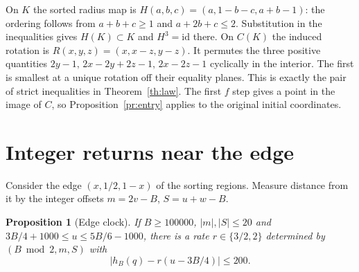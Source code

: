 \documentclass[11pt,reqno]{amsart}
\newtheorem{proposition}[theorem]{Proposition}
\begin{document}
On $K$ the sorted radius map is $H(a,b,c)=(a,1-b-c,a+b-1)$:
the ordering follows from $a+b+c\ge1$ and $a+2b+c\le2$. Substitution
in the inequalities gives $H(K)\subset K$ and $H^3=\mathrm{id}$ there.
On $C(K)$ the induced rotation is $R(x,y,z)=(x,x-z,y-z)$. It permutes
the three positive quantities $2y-1,\,2x-2y+2z-1,\,2x-2z-1$ cyclically
in the interior. The first is smallest at a unique rotation off their
equality planes. This is exactly the pair of strict inequalities in
Theorem~\ref{th:law}. The first $f$ step gives a point in the image of $C$,
so Proposition~\ref{pr:entry} applies to the original initial coordinates.
\section{Integer returns near the edge}
Consider the edge $(x,1/2,1-x)$ of the sorting regions. Measure distance
from it by the integer offsets $m=2v-B$, $S=u+w-B$.
\begin{proposition}[Edge clock]\label{pr:edge}
If $B\ge100000$, $|m|,|S|\le20$ and
$3B/4+1000\le u\le5B/6-1000$, there is a rate
$r\in\{3/2,2\}$ determined by $(B\bmod2,m,S)$ with
\[
 |h_B(q)-r(u-3B/4)|\le200 .
\]
\end{proposition}
\end{document}
